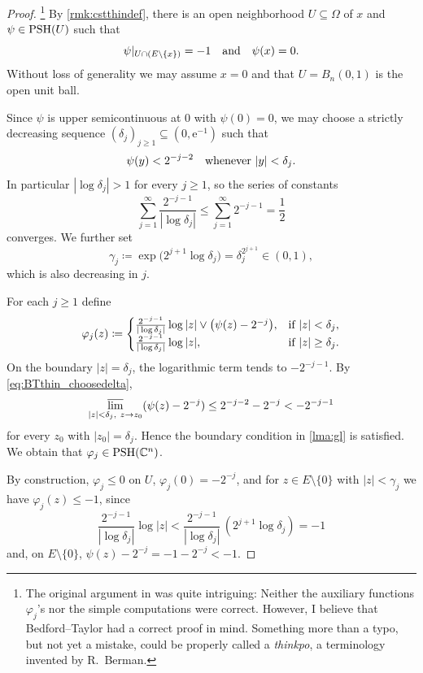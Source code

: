 \begin{proof}\footnote{The original argument in \cite[Proposition~10.2]{BT82} was quite intriguing: Neither the auxiliary functions $\varphi_j$'s nor the simple computations were correct. However, I believe that Bedford--Taylor had a correct proof in mind. Something more than a typo, but not yet a mistake, could be properly called a \emph{thinkpo}, a terminology invented by R.~Berman.}
By \cref{rmk:cstthindef}, there is an open neighborhood $U\subseteq \Omega$ of $x$ and $\psi\in \mathrm{PSH}(U)$ such that
\[
    \psi|_{U\cap (E\setminus\{x\})}=-1 \quad\textup{and}\quad \psi(x)=0.
\]
Without loss of generality we may assume $x=0$ and that $U=B_n(0,1)$ is the open unit ball.

Since $\psi$ is upper semicontinuous at $0$ with $\psi(0)=0$, we may choose a strictly decreasing sequence $(\delta_j)_{j\geq 1}\subseteq (0,\mathrm{e}^{-1})$ such that
\begin{equation}\label{eq:BTthin_choosedelta}
    \psi(y)<2^{-j-2}\quad\textup{whenever } |y|<\delta_j.
\end{equation}
In particular $|\log\delta_j|>1$ for every $j\geq 1$, so the series of constants
\begin{equation}\label{eq:BTthin_summable}
    \sum_{j=1}^\infty \frac{2^{-j-1}}{|\log\delta_j|} \leq \sum_{j=1}^\infty 2^{-j-1}=\frac{1}{2}
\end{equation}
converges. We further set
\[
    \gamma_j\coloneqq \exp\bigl(2^{j+1}\log\delta_j\bigr)=\delta_j^{2^{j+1}}\in(0,1),
\]
which is also decreasing in $j$.

For each $j\geq 1$ define
\[
    \varphi_j(z)\coloneqq
    \begin{cases}
        \frac{2^{-j-1}}{|\log\delta_j|}\log|z|\lor\bigl(\psi(z)-2^{-j}\bigr), &\textup{if } |z|<\delta_j,\\
        \frac{2^{-j-1}}{|\log\delta_j|}\log|z|,&\textup{if } |z|\geq \delta_j.
    \end{cases}
\]
On the boundary $|z|=\delta_j$, the logarithmic term tends to $-2^{-j-1}$. By \eqref{eq:BTthin_choosedelta},
\[
    \varlimsup_{|z|<\delta_j,\ z\to z_0}(\psi(z)-2^{-j})\leq 2^{-j-2}-2^{-j}<-2^{-j-1}
\]
for every $z_0$ with $|z_0|=\delta_j$. Hence the boundary condition in \cref{lma:gl} is satisfied. We obtain that $\varphi_j\in \mathrm{PSH}(\mathbb{C}^n)$.

By construction, $\varphi_j\leq 0$ on $U$, $\varphi_j(0)=-2^{-j}$, and for $z\in E\setminus\{0\}$ with $|z|<\gamma_j$ we have $\varphi_j(z)\leq -1$, since
\[
    \frac{2^{-j-1}}{|\log\delta_j|}\log|z|<\frac{2^{-j-1}}{|\log\delta_j|}\,(2^{j+1}\log\delta_j)=-1
\]
and, on $E\setminus\{0\}$, $\psi(z)-2^{-j}=-1-2^{-j}<-1$.


\end{proof}
